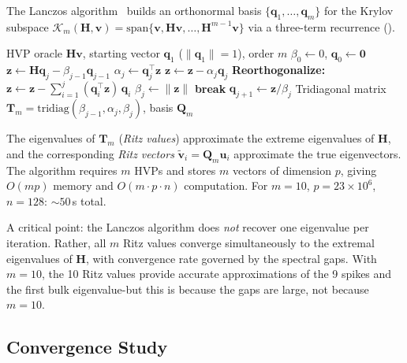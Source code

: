 \documentclass[11pt,a4paper]{article}
\newcommand{\norm}[1]{\lVert #1 \rVert}
\newcommand{\mat}[1]{\bm{#1}}
\newcommand{\vect}[1]{\bm{#1}}
\newcommand{\Hess}{\mat{H}}
\begin{document}
The Lanczos algorithm~\cite{lanczos1950} builds an orthonormal basis
$\{\vect{q}_1, \ldots, \vect{q}_m\}$ for the Krylov subspace
$\mathcal{K}_m(\Hess, \vect{v}) =
\mathrm{span}\{\vect{v}, \Hess\vect{v}, \ldots,
\Hess^{m-1}\vect{v}\}$ via a three-term recurrence
().

\begin{algorithm}[ht]
\caption{Lanczos tridiagonalization with full reorthogonalization}
\label{alg:lanczos}
\begin{algorithmic}[1]
\REQUIRE HVP oracle $\Hess\vect{v}$, starting vector $\vect{q}_1$
  ($\norm{\vect{q}_1}=1$), order $m$
\STATE $\beta_0 \leftarrow 0$, $\vect{q}_0 \leftarrow \vect{0}$
  \STATE $\vect{z} \leftarrow \Hess \vect{q}_j
    - \beta_{j-1}\vect{q}_{j-1}$
  \STATE $\alpha_j \leftarrow \vect{q}_j^\top \vect{z}$
  \STATE $\vect{z} \leftarrow \vect{z} - \alpha_j \vect{q}_j$
  \STATE \textbf{Reorthogonalize:}
    $\vect{z} \leftarrow \vect{z}
    - \sum_{i=1}^{j} (\vect{q}_i^\top \vect{z})\,\vect{q}_i$
    \hfill{}
  \STATE $\beta_j \leftarrow \norm{\vect{z}}$
    \STATE \textbf{break}
    \hfill{}
  \ENDIF
  \STATE $\vect{q}_{j+1} \leftarrow \vect{z} / \beta_j$
\ENDFOR
\ENSURE Tridiagonal matrix
  $\mat{T}_m = \mathrm{tridiag}(\beta_{j-1}, \alpha_j, \beta_j)$,
  basis $\mat{Q}_m$
\end{algorithmic}
\end{algorithm}

The eigenvalues of $\mat{T}_m$ (\emph{Ritz values}) approximate the
extreme eigenvalues of $\Hess$, and the corresponding \emph{Ritz
vectors} $\tilde{\vect{v}}_i = \mat{Q}_m \vect{u}_i$ approximate the
true eigenvectors. The algorithm requires $m$ HVPs and stores $m$
vectors of dimension $p$, giving $O(mp)$ memory and
$O(m \cdot p \cdot n)$ computation. For $m=10$,
$p = 23 \times 10^6$, $n=128$: ${\sim}50$\,s total.

A critical point: the Lanczos algorithm does \emph{not} recover one
eigenvalue per iteration. Rather, all $m$ Ritz values converge
simultaneously to the extremal eigenvalues of $\Hess$, with convergence
rate governed by the spectral gaps. With $m = 10$, the 10 Ritz values
provide accurate approximations of the 9 spikes and the first bulk
eigenvalue-but this is because the gaps are large, not because
$m = 10 $. 

\subsection{Convergence Study}
\label{sec:convergence}
\end{document}

